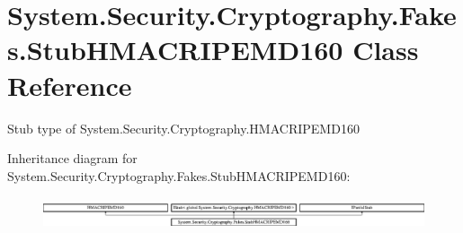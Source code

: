 \hypertarget{class_system_1_1_security_1_1_cryptography_1_1_fakes_1_1_stub_h_m_a_c_r_i_p_e_m_d160}{\section{System.\-Security.\-Cryptography.\-Fakes.\-Stub\-H\-M\-A\-C\-R\-I\-P\-E\-M\-D160 Class Reference}
\label{class_system_1_1_security_1_1_cryptography_1_1_fakes_1_1_stub_h_m_a_c_r_i_p_e_m_d160}
}


Stub type of System.\-Security.\-Cryptography.\-H\-M\-A\-C\-R\-I\-P\-E\-M\-D160 


Inheritance diagram for System.\-Security.\-Cryptography.\-Fakes.\-Stub\-H\-M\-A\-C\-R\-I\-P\-E\-M\-D160\-:\begin{figure}[H]
\begin{center}
\leavevmode
\includegraphics[height=0.949958cm]{class_system_1_1_security_1_1_cryptography_1_1_fakes_1_1_stub_h_m_a_c_r_i_p_e_m_d160}
\end{center}
\end{figure}
